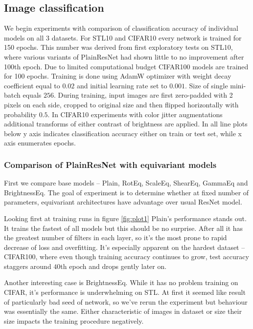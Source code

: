 \newpage










\subsection{Image classification}
    We begin experiments with comparison of classification accuracy of
    individual models on all 3 datasets. For STL10 and CIFAR10 every network
    is trained for 150 epochs. This number was derived from first exploratory
    tests on STL10, where various variants of PlainResNet had shown little to
    no improvement after 100th epoch. Due to limited computational budget
    CIFAR100 models are trained for 100 epochs. Training is done using AdamW
    optimizer \cite{adamw} with weight decay coefficient equal to $0.02$ and
    initial learning rate set to $0.001$. Size of single mini-batch equals
    $256$. During training, input images are first zero-padded with 2 pixels
    on each side, cropped to original size and then flipped horizontally with
    probability $0.5$. In CIFAR10 experiments with color jitter augmentations
    additional transforms of either contrast of brightness are applied.
    In all line plots below y axis indicates classification accuracy either on
    train or test set, while x axis enumerates epochs.

    \subsubsection*{Comparison of PlainResNet with equivariant models}
    First we compare base models -- Plain, RotEq, ScaleEq, ShearEq, GammaEq and
    BrightnessEq. The goal of experiment is to determine whether at fixed number
    of parameters, equivariant
    architectures have advantage over usual ResNet model.

    Looking first at
    training runs in figure \ref{fig:plot1} Plain's performance stands out.
    It trains the fastest of all models but this should be no surprise. After
    all it has the greatest number of filters in each layer, so it's the most
    prone to rapid decrease of loss and overfitting. It's especially apparent on
    the hardest dataset --
    CIFAR100, where even though training accuracy continues to grow, test
    accuracy staggers around $40$th epoch and drops gently later on.

    Another interesting case is BrightnessEq. While it has no problem training
    on CIFAR, it's performance is underwhelming on STL. At first it seemed like
    result of particularly bad seed of network, so we've rerun the experiment
    but behaviour was essentially the same. Either characteristic of images in
    dataset or size their size impacts the training procedure negatively.

